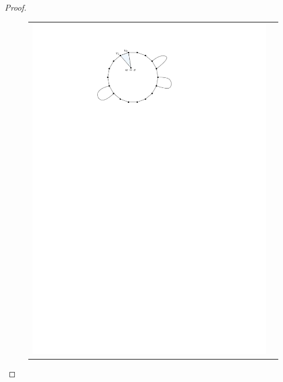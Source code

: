 \documentclass[12pt]{article}
\theoremstyle{definition}
\begin{document}
\begin{proof}
   \begin{figure}[htbp]
     \begin{center}
       \begin{tabular}{cc}
         \includegraphics[page=1]{figs/degree_2_outer_neighbour} &

\end{tabular}
\end{center}
\end{figure}
\end{proof}
\end{document}
